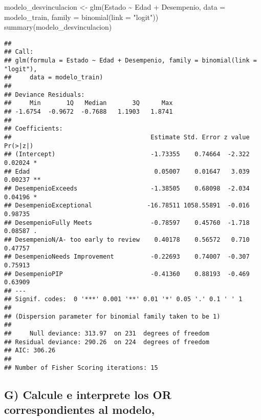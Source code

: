 \documentclass[
]{article}
\newenvironment{Shaded}{\begin{snugshade}}{\end{snugshade}}
\newcommand{\AttributeTok}[1]{\textcolor[rgb]{0.77,0.63,0.00}{#1}}
\newcommand{\FunctionTok}[1]{\textcolor[rgb]{0.00,0.00,0.00}{#1}}
\newcommand{\NormalTok}[1]{#1}
\newcommand{\OtherTok}[1]{\textcolor[rgb]{0.56,0.35,0.01}{#1}}
\newcommand{\SpecialCharTok}[1]{\textcolor[rgb]{0.00,0.00,0.00}{#1}}
\newcommand{\StringTok}[1]{\textcolor[rgb]{0.31,0.60,0.02}{#1}}
\begin{document}
\begin{Shaded}
\begin{Highlighting}[]
\NormalTok{modelo\_desvinculacion }\OtherTok{\textless{}{-}} \FunctionTok{glm}\NormalTok{(Estado }\SpecialCharTok{\textasciitilde{}}\NormalTok{ Edad }\SpecialCharTok{+}\NormalTok{ Desempenio, }
                             \AttributeTok{data =}\NormalTok{ modelo\_train,}
                             \AttributeTok{family =} \FunctionTok{binomial}\NormalTok{(}\AttributeTok{link =} \StringTok{"logit"}\NormalTok{))}
\FunctionTok{summary}\NormalTok{(modelo\_desvinculacion)}
\end{Highlighting}
\end{Shaded}

\begin{verbatim}
## 
## Call:
## glm(formula = Estado ~ Edad + Desempenio, family = binomial(link = "logit"), 
##     data = modelo_train)
## 
## Deviance Residuals: 
##     Min       1Q   Median       3Q      Max  
## -1.6754  -0.9672  -0.7688   1.1903   1.8741  
## 
## Coefficients:
##                                      Estimate Std. Error z value Pr(>|z|)   
## (Intercept)                          -1.73355    0.74664  -2.322  0.02024 * 
## Edad                                  0.05007    0.01647   3.039  0.00237 **
## DesempenioExceeds                    -1.38505    0.68098  -2.034  0.04196 * 
## DesempenioExceptional               -16.78511 1058.55891  -0.016  0.98735   
## DesempenioFully Meets                -0.78597    0.45760  -1.718  0.08587 . 
## DesempenioN/A- too early to review    0.40178    0.56572   0.710  0.47757   
## DesempenioNeeds Improvement          -0.22693    0.74007  -0.307  0.75913   
## DesempenioPIP                        -0.41360    0.88193  -0.469  0.63909   
## ---
## Signif. codes:  0 '***' 0.001 '**' 0.01 '*' 0.05 '.' 0.1 ' ' 1
## 
## (Dispersion parameter for binomial family taken to be 1)
## 
##     Null deviance: 313.97  on 231  degrees of freedom
## Residual deviance: 290.26  on 224  degrees of freedom
## AIC: 306.26
## 
## Number of Fisher Scoring iterations: 15
\end{verbatim}

\hypertarget{g-calcule-e-interprete-los-or-correspondientes-al-modelo}{%
\subsection{G) Calcule e interprete los OR correspondientes al
modelo,}\label{g-calcule-e-interprete-los-or-correspondientes-al-modelo}}
\end{document}
